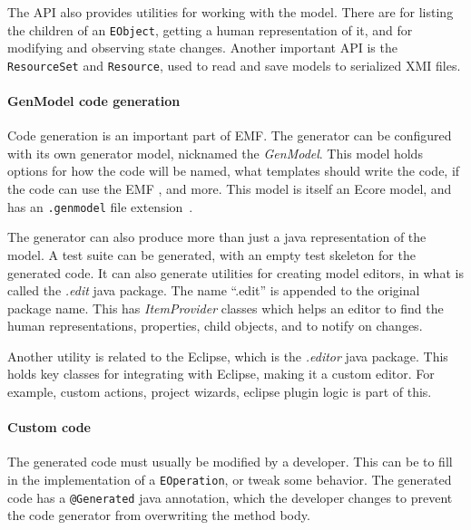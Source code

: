 The \acrshort{API} also provides utilities for working with the model.
There are  for listing the children of an \texttt{EObject}, getting a human representation of it, and for modifying and observing state changes.
Another important \acrshort{API} is the \texttt{ResourceSet} and \texttt{Resource}, used to read and save models to serialized \acrshort{XMI} files.

\paragraph{GenModel code generation}
Code generation is an important part of \acrshort{EMF}.
The generator can be configured with its own generator model, nicknamed the \textit{GenModel}.
This model holds options for how the code will be named, what templates should write the code, if the code can use the \acrshort{EMF} , and more.
This model is itself an \gls{Ecore} model, and has an \texttt{.genmodel} file extension~\cite[p.~28]{edmerksEMFEclipseModeling2009}.


The generator can also produce more than just a java representation of the model.
A test suite can be generated, with an empty test skeleton for the generated code.
It can also generate utilities for creating model editors, in what is called the \textit{.edit} java package.
The name ``.edit'' is appended to the original package name.
This has \textit{ItemProvider} classes which helps an editor to find the human representations, properties, child objects, and to notify on changes.


Another utility is related to the \gls{Eclipse}, which is the \textit{.editor} java package.
This holds key classes for integrating with \gls{Eclipse}, making it a custom editor.
For example, custom actions, project wizards, eclipse plugin logic is part of this.


\paragraph{Custom code}
The generated code must usually be modified by a developer.
This can be to fill in the implementation of a \texttt{EOperation}, or tweak some behavior.
The generated code has a \texttt{@Generated} java annotation, which the developer changes to prevent the code generator from overwriting the method body.
